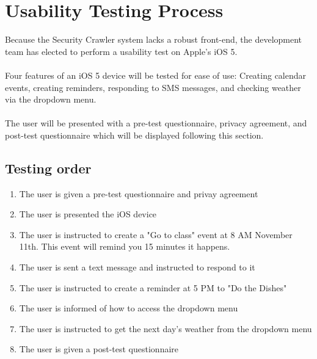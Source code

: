 \section{Usability Testing Process}
Because the Security Crawler system lacks a robust front-end, the development team has elected to perform a usability test on Apple's iOS 5. \\\\
Four features of an iOS 5 device will be tested for ease of use:  Creating calendar events, creating reminders, responding to SMS messages, and checking weather via the dropdown menu.\\\\
The user will be presented with a pre-test questionnaire, privacy agreement, and post-test questionnaire which will be displayed following this section.

\subsection{Testing order}
\begin{enumerate}
\item The user is given a pre-test questionnaire and privay agreement
\item The user is presented the iOS device
\item The user is instructed to create a "Go to class" event at 8 AM November 11th.  This event will remind you 15 minutes it happens.
\item The user is sent a text message and instructed to respond to it
\item The user is instructed to create a reminder at 5 PM to "Do the Dishes"
\item The user is informed of how to access the dropdown menu
\item The user is instructed to get the next day's weather from the dropdown menu
\item The user is given a post-test questionnaire
\end{enumerate}
